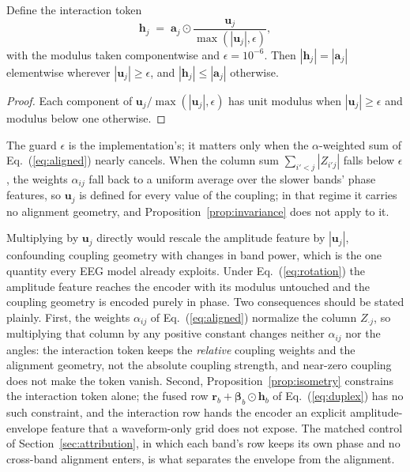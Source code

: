 \begin{proposition}
\label{prop:isometry}
Define the interaction token
\begin{equation}
\mathbf{h}_j \;=\; \mathbf{a}_j \odot
\frac{\mathbf{u}_j}{\max(|\mathbf{u}_j|, \epsilon)} ,
\label{eq:rotation}
\end{equation}
with the modulus taken componentwise and $\epsilon = 10^{-6}$. Then
$|\mathbf{h}_j| = |\mathbf{a}_j|$ elementwise wherever $|\mathbf{u}_j| \ge
\epsilon$, and $|\mathbf{h}_j| \le |\mathbf{a}_j|$ otherwise.
\end{proposition}
\begin{proof}
Each component of $\mathbf{u}_j/\max(|\mathbf{u}_j|,\epsilon)$ has unit
modulus when $|\mathbf{u}_j| \ge \epsilon$ and modulus below one otherwise.
\end{proof}

The guard $\epsilon$ is the implementation's; it matters only when the
$\alpha$-weighted sum of Eq.~(\ref{eq:aligned}) nearly cancels. When
the column sum $\sum_{i'<j}|Z_{i'j}|$ falls below $\epsilon$, the weights
$\alpha_{ij}$ fall back to a uniform average over the slower bands'
phase features, so $\mathbf{u}_j$ is defined for every value of the
coupling; in that regime it carries no alignment geometry, and
Proposition~\ref{prop:invariance} does not apply to it.

Multiplying by $\mathbf{u}_j$ directly would rescale the amplitude feature
by $|\mathbf{u}_j|$, confounding coupling geometry with changes in band
power, which is the one quantity every EEG model already exploits. Under
Eq.~(\ref{eq:rotation}) the amplitude feature reaches the encoder with
its modulus untouched and the coupling geometry is encoded purely in
phase. Two consequences should be stated plainly. First, the weights
$\alpha_{ij}$ of Eq.~(\ref{eq:aligned}) normalize the column
$Z_{\cdot j}$, so multiplying that column by any positive constant changes
neither $\alpha_{ij}$ nor the angles: the interaction token keeps the
\emph{relative} coupling weights and the alignment geometry, not the
absolute coupling strength, and near-zero coupling does not make the
token vanish. Second, Proposition~\ref{prop:isometry} constrains the
interaction token alone; the fused row $\mathbf{r}_b + \boldsymbol{\beta}_b
\odot \mathbf{h}_b$ of Eq.~(\ref{eq:duplex}) has no such constraint, and
the interaction row hands the encoder an explicit amplitude-envelope
feature that a waveform-only grid does not expose. The matched control of
Section~\ref{sec:attribution}, in which each band's row keeps its own
phase and no cross-band alignment enters, is what separates the envelope
from the alignment.

